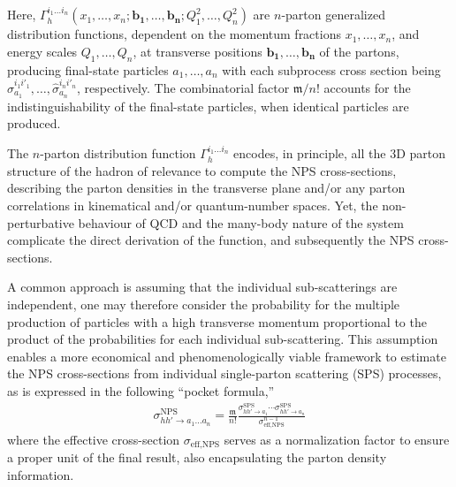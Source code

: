 \begin{survey}
Here, $\Gamma_h^{i_1\dots i_n}(x_1,\dots,x_n;\mathbf{b_1},\dots,\mathbf{b_n};Q_1^2,\dots,Q_n^2)$ are $n$-parton generalized distribution functions, dependent on the momentum fractions $x_1, \dots, x_n$, and energy scales $Q_1,\dots,Q_n$, at transverse positions $\mathbf{b_1}, \dots, \mathbf{b_n}$ of the partons, producing final-state particles $a_1, \dots, a_n$ with each subprocess cross section being $\hat{\sigma}_{a_1}^{i_1i'_1}, \dots, \hat{\sigma}_{a_n}^{i_ni'_n}$, respectively.
The combinatorial factor $\mathfrak{m}/n!$ accounts for the indistinguishability of the final-state particles, when identical particles are produced.

The $n$-parton distribution function $\Gamma_h^{i_1\dots i_n}$ encodes, in principle, all the 3D parton structure of the hadron of relevance to compute the NPS cross-sections, describing the parton densities in the transverse plane and/or any parton correlations in kinematical and/or quantum-number spaces.
Yet, the non-perturbative behaviour of QCD and the many-body nature of the system complicate the direct derivation of the function, and subsequently the NPS cross-sections.

A common approach is assuming that the individual sub-scatterings are independent, one may therefore consider the probability for the multiple production of particles with a high transverse momentum proportional to the product of the probabilities for each individual sub-scattering.
This assumption enables a more economical and phenomenologically viable framework to estimate the NPS cross-sections from individual single-parton scattering (SPS) processes, as is expressed in the following ``pocket formula,''
\begin{equation}
\begin{aligned}
    \label{eq:appendix-survey-nps-pocket}
    \sigma_{hh'\to a_1\dots a_n}^{\text{NPS}}
    =
    \frac{\mathfrak{m}}{n!} \frac{\sigma_{hh'\to a_1}^{\text{SPS}}\cdots \sigma_{hh'\to a_n}^{\text{SPS}}}{\sigma_{\text{eff,NPS}}^{n-1}}
\end{aligned}
\end{equation}
where the effective cross-section $\sigma_{\text{eff,NPS}}$ serves as a normalization factor to ensure a proper unit of the final result, also encapsulating the parton density information.


\end{survey}
